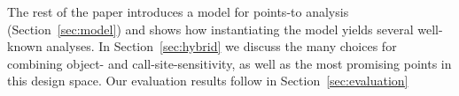 The rest of the paper introduces a model for points-to analysis
(Section~\ref{sec:model}) and shows how instantiating the model yields
several well-known analyses. In Section~\ref{sec:hybrid} we discuss the many
choices for combining object- and call-site-sensitivity, as well as
the most promising points in this design space. Our evaluation results
follow in Section~\ref{sec:evaluation}





